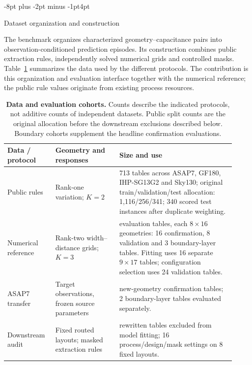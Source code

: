 \documentclass{article}
\makeatletter
\renewcommand{\section}{\@startsection{section}{1}{\z@}
  {-8pt plus -2pt minus -1pt}{4pt}{\large\sc\raggedright}}
\makeatother
\begin{document}
\section{Dataset organization and construction}
\label{app:data-construction}

The benchmark organizes characterized geometry--capacitance pairs into
observation-conditioned prediction episodes. Its construction combines public
extraction rules, independently solved numerical grids and controlled masks.
Table~\ref{tab:data-overview} summarizes the data used by the different protocols.
The contribution is this organization and evaluation interface together with the
numerical reference; the public rule values originate from existing process
resources.

\begin{table}[htbp]
\centering\small
\caption{\textbf{Data and evaluation cohorts.} Counts describe the indicated
protocols, not additive counts of independent datasets. Public split counts are
the original allocation before the downstream exclusions described below.
Boundary cohorts supplement the headline confirmation evaluations.}
\label{tab:data-overview}
\begin{tabular}{@{}>{\raggedright\arraybackslash}p{0.19\linewidth}>{\raggedright\arraybackslash}p{0.26\linewidth}>{\raggedright\arraybackslash}p{0.47\linewidth}@{}}
\toprule
Data / protocol & Geometry and responses & Size and use \\
\midrule
Public rules & Rank-one variation; $K=2$ &
1{,}713 tables across ASAP7, GF180, IHP-SG13G2 and Sky130; original
train/validation/test allocation: 1{,}116/256/341; 340 scored test instances
after duplicate weighting. \\
\addlinespace
Numerical reference & Rank-two width--distance grids; $K=3$ &
27 evaluation tables, each $8\times16$ geometries: 16 confirmation,
8 validation and 3 boundary-layer tables. Fitting uses 16 separate
$9\times17$ tables; configuration selection uses 24 validation tables. \\
\addlinespace
ASAP7 transfer & Target observations, frozen source parameters &
8 new-geometry confirmation tables; 2 boundary-layer tables evaluated separately. \\
\addlinespace
Downstream audit & Fixed routed layouts; masked extraction rules &
84 rewritten tables excluded from model fitting; 16 process/design/mask
settings on 8 fixed layouts. \\
\bottomrule
\end{tabular}
\end{table}
\end{document}
